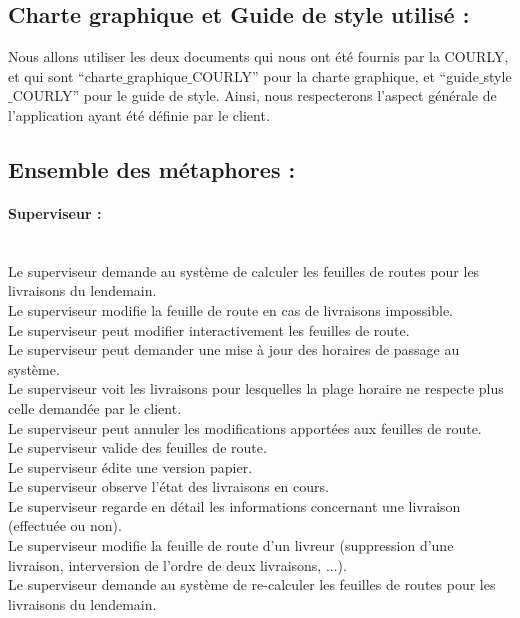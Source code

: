 \documentclass{report}
\begin{document}
\subsection{Charte graphique et Guide de style utilisé : }

Nous allons utiliser les deux documents qui nous ont été fournis par la COURLY, et qui sont “charte$\_$graphique$\_$COURLY” pour la charte graphique, et “guide$\_$style$\_$COURLY” pour le guide de style. Ainsi, nous respecterons l’aspect générale de l’application ayant été définie par le client.

\subsection{Ensemble des métaphores : }

\paragraph{Superviseur :}
~~\\
Le superviseur demande au système de calculer les feuilles de routes pour les livraisons du lendemain.\\
Le superviseur modifie la feuille de route en cas de livraisons impossible.\\
Le superviseur peut modifier interactivement les feuilles de route.\\
Le superviseur peut demander une mise à jour des horaires de passage au système.\\
Le superviseur voit les livraisons pour lesquelles la plage horaire ne respecte plus celle demandée par le client.\\
Le superviseur peut annuler les modifications apportées aux feuilles de route.\\
Le superviseur valide des feuilles de route.\\
Le superviseur édite une version papier.\\
Le superviseur observe l’état des livraisons en cours. \\
Le superviseur regarde en détail les informations concernant une livraison (effectuée ou non).\\
Le superviseur modifie la feuille de route d’un livreur (suppression d’une livraison, interversion de l’ordre de deux livraisons, ...).\\
Le superviseur demande au système de re-calculer les feuilles de routes pour les livraisons du lendemain.\\
\end{document}
